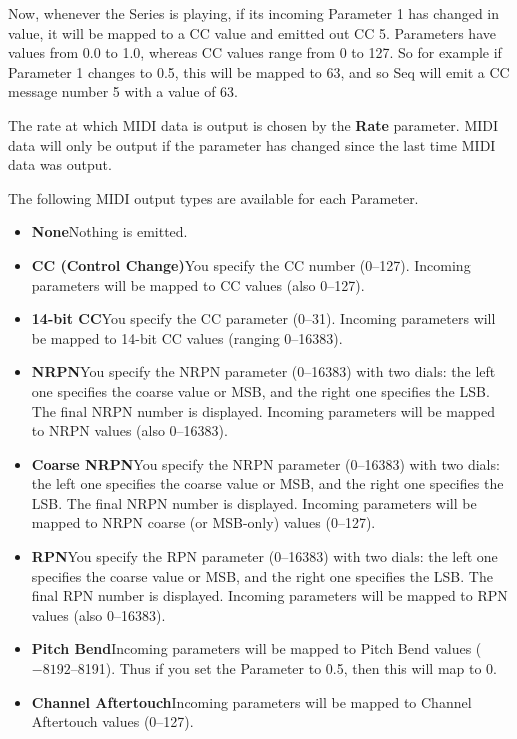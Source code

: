 \documentclass[twoside,10pt]{article}
\begin{document}
Now, whenever the Series is playing, if its incoming Parameter 1 has changed in value, it will be mapped to a CC value and emitted out CC 5.  Parameters have values from 0.0 to 1.0, whereas CC values range from 0 to 127.  So for example if Parameter 1 changes to 0.5, this will be mapped to 63, and so Seq will emit a CC message number 5 with a value of 63.

The rate at which MIDI data is output is chosen by the {\bf Rate} parameter.  MIDI data will only be output if the parameter has changed since the last time MIDI data was output.

The following MIDI output types are available for each Parameter.

\begin{itemize} 
\item {\bf None}\quad Nothing is emitted.
\item {\bf CC (Control Change)}\quad You specify the CC number (0--127).  Incoming parameters will be mapped to CC values (also 0--127).
\item {\bf 14-bit CC}\quad You specify the CC parameter (0--31).  Incoming parameters will be mapped to 14-bit CC values (ranging 0--16383).
\item {\bf NRPN}\quad You specify the NRPN parameter (0--16383) with two dials: the left one specifies the coarse value or MSB, and the right one specifies the LSB.  The final NRPN number is displayed.  Incoming parameters will be mapped to NRPN values (also 0--16383).
\item {\bf Coarse NRPN}\quad You specify the NRPN parameter (0--16383) with two dials: the left one specifies the coarse value or MSB, and the right one specifies the LSB.  The final NRPN number is displayed.  Incoming parameters will be mapped to NRPN coarse (or MSB-only) values (0--127).
\item {\bf RPN}\quad You specify the RPN parameter (0--16383) with two dials: the left one specifies the coarse value or MSB, and the right one specifies the LSB.  The final RPN number is displayed.  Incoming parameters will be mapped to RPN values (also 0--16383).
\item {\bf Pitch Bend}\quad Incoming parameters will be mapped to Pitch Bend values (\(-8192\)--8191).  Thus if you set the Parameter to 0.5, then this will map to 0.
\item {\bf Channel Aftertouch}\quad Incoming parameters will be mapped to Channel Aftertouch values (0--127).
\end{itemize}
\end{document}
